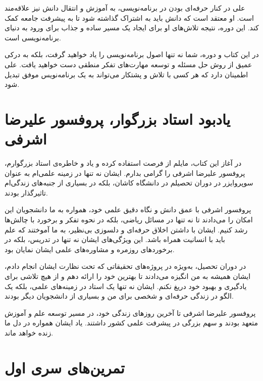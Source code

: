 \documentclass[a4paper,12pt]{article}
\begin{document}
	علی در کنار حرفه‌ای بودن در برنامه‌نویسی، به آموزش و انتقال دانش نیز علاقه‌مند است. او معتقد است که دانش باید به اشتراک گذاشته شود تا به پیشرفت جامعه کمک کند. این دوره، نتیجه تلاش‌های او برای ایجاد یک مسیر ساده و جذاب برای ورود به دنیای برنامه‌نویسی است. 
	
	در این کتاب و دوره، شما نه تنها اصول برنامه‌نویسی را یاد خواهید گرفت، بلکه به درکی عمیق از روش حل مسئله و توسعه مهارت‌های تفکر منطقی دست خواهید یافت. علی اطمینان دارد که هر کسی با تلاش و پشتکار می‌تواند به یک برنامه‌نویس موفق تبدیل شود.
	
	
	\newpage
	
	\section*{یادبود استاد بزرگوار، پروفسور علیرضا اشرفی}
	
	در آغاز این کتاب، مایلم از فرصت استفاده کرده و یاد و خاطره‌ی استاد بزرگوارم، پروفسور علیرضا اشرفی را گرامی بدارم. ایشان نه تنها در زمینه علمی‌ام به عنوان سوپروایزر در دوران تحصیلم در دانشگاه کاشان، بلکه در بسیاری از جنبه‌های زندگی‌ام تاثیرگذار بودند.
	
	پروفسور اشرفی با عمق دانش و نگاه دقیق علمی‌ خود، همواره به ما دانشجویان این امکان را می‌دادند تا نه تنها در مسائل ریاضی، بلکه در نحوه تفکر و برخورد با چالش‌ها رشد کنیم. ایشان با داشتن اخلاق حرفه‌ای و دلسوزی بی‌نظیر، به ما آموختند که علم باید با انسانیت همراه باشد. این ویژگی‌های ایشان نه تنها در تدریس، بلکه در برخوردهای روزمره‌ و مشاوره‌های علمی‌ ایشان نمایان بود.
	
	در دوران تحصیل، به‌ویژه در پروژه‌های تحقیقاتی که تحت نظارت ایشان انجام دادم، ایشان همیشه به من انگیزه می‌دادند تا بهترین خود را ارائه دهم و از هیچ تلاشی برای یادگیری و بهبود خود دریغ نکنم. ایشان نه تنها یک استاد در زمینه‌های علمی، بلکه یک الگو در زندگی حرفه‌ای و شخصی برای من و بسیاری از دانشجویان دیگر بودند.
	
	پروفسور علیرضا اشرفی تا آخرین روزهای زندگی‌ خود، در مسیر توسعه علم و آموزش متعهد بودند و سهم بزرگی در پیشرفت علمی کشور داشتند. یاد ایشان همواره در دل ما زنده خواهد ماند.
	
	
	\newpage
	\section*{تمرین‌های سری اول}
	
\end{document}
